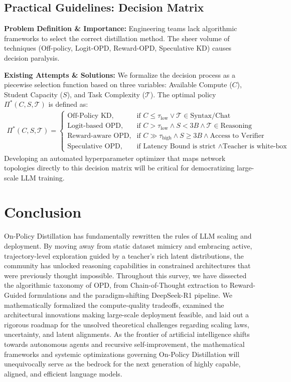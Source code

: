 \subsection{Practical Guidelines: Decision Matrix}
\textbf{Problem Definition \& Importance:} Engineering teams lack algorithmic frameworks to select the correct distillation method. The sheer volume of techniques (Off-policy, Logit-OPD, Reward-OPD, Speculative KD) causes decision paralysis.

\textbf{Existing Attempts \& Solutions:} We formalize the decision process as a piecewise selection function based on three variables: Available Compute ($C$), Student Capacity ($S$), and Task Complexity ($\mathcal{T}$). The optimal policy $\Pi^*(C, S, \mathcal{T})$ is defined as:
\begin{align}
\Pi^*(C, S, \mathcal{T}) = 
\begin{cases} 
\text{Off-Policy KD}, & \text{if } C \le \tau_{\text{low}} \lor \mathcal{T} \in \text{Syntax/Chat} \\
\text{Logit-based OPD}, & \text{if } C > \tau_{\text{low}} \land S < 3B \land \mathcal{T} \in \text{Reasoning} \\
\text{Reward-aware OPD}, & \text{if } C \gg \tau_{\text{high}} \land S \ge 3B \land \text{Access to Verifier} \\
\text{Speculative OPD}, & \text{if Latency Bound is strict } \land \text{Teacher is white-box}
\end{cases}
\end{align}
Developing an automated hyperparameter optimizer that maps network topologies directly to this decision matrix will be critical for democratizing large-scale LLM training.

\section{Conclusion}
\label{sec:conclusion}
On-Policy Distillation has fundamentally rewritten the rules of LLM scaling and deployment. By moving away from static dataset mimicry and embracing active, trajectory-level exploration guided by a teacher's rich latent distributions, the community has unlocked reasoning capabilities in constrained architectures that were previously thought impossible. Throughout this survey, we have dissected the algorithmic taxonomy of OPD, from Chain-of-Thought extraction to Reward-Guided formulations and the paradigm-shifting DeepSeek-R1 pipeline. We mathematically formalized the compute-quality tradeoffs, examined the architectural innovations making large-scale deployment feasible, and laid out a rigorous roadmap for the unsolved theoretical challenges regarding scaling laws, uncertainty, and latent alignments. As the frontier of artificial intelligence shifts towards autonomous agents and recursive self-improvement, the mathematical frameworks and systemic optimizations governing On-Policy Distillation will unequivocally serve as the bedrock for the next generation of highly capable, aligned, and efficient language models.

